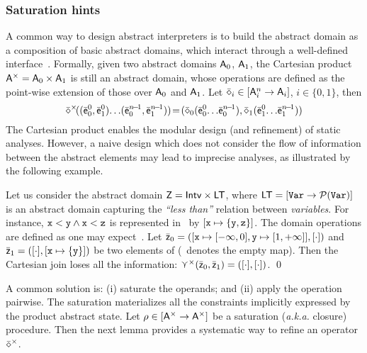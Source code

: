 \documentclass[sttt]{svjour}
\begin{document}
\subsubsection{Saturation hints}
A common way to design abstract interpreters is to build the abstract domain as a composition of basic abstract domains, which interact through a well-defined interface~\cite{CousotEtAl06,ChangLeino05,GulwaniEtAl08}.
Formally, given two abstract domains ${\mathsf{A}}_0$, ${\mathsf{A}}_{1}$, the Cartesian product ${\mathsf{A}}^\times = {\mathsf{A}}_0 \times {\mathsf{A}}_{1}$ is still an abstract domain, whose operations are defined as the point-wise extension of those over ${\mathsf{A}}_0$ and ${\mathsf{A}}_{1}$.
Let $\bar{\mathsf{\mathsf{\diamond}}}_i \in [{\mathsf{A}}_i^n \rightarrow{\mathsf{A}}_i]$, $i \in \{ 0, 1\}$, then 
\[
\ael{\op}^\times\!((\ael{e}^0_0, \ael{e}^0_1) \!\dots\! (\ael{e}^{n\!-\!1}_0, \ael{e}^{n\!-\!1}_1)) \!=\! (\ael{\op}_0(\ael{e}^0_0 \!\dots\! \ael{e}^{n\!-\!1}_0), \ael{\op}_1(\ael{e}^{0}_1 \!\dots\! \ael{e}^{n\!-\!1}_1))
\]
The Cartesian product enables the modular design (and refinement) of static analyses.
However, a naive design which does not consider the flow of information between the abstract elements may lead to imprecise analyses, as illustrated by the following example.

\begin{example}
\label{ex:cartesian}
Let us consider the abstract domain ${\mathsf{Z}} = \mathsf{Intv} \times \mathsf{LT}$, where $\mathsf{LT} = [\mathtt{Var} \rightarrow\mathcal{P}{(\mathtt{Var})}]$ is an abstract domain capturing the \emph{``less than''} relation between \emph{variables}.
For instance, $\mathtt{x} < \mathtt{y} \wedge \mathtt{x} < \mathtt{z}$ is represented in \LT\ by $[ \mathtt{x} \mapsto \{ \mathtt{y}, \mathtt{z}\}]$.
The domain operations are defined as one may expect~\cite{LogozzoMaf08}.
Let $\bar{\mathsf{\mathsf{z}}}_0 = ([\mathtt{x} \mapsto [-\infty, 0], \mathtt{y} \mapsto [1, +\infty]], [\cdot] )$ and $\bar{\mathsf{\mathsf{z}}}_1 = ([\cdot], [\mathtt{x} \mapsto \{ \mathtt{y}\}]  )$ be two elements of  (\emptyfun\ denotes the empty map).
Then the Cartesian join loses all the information: $\curlyvee^\times(\bar{\mathsf{\mathsf{z}}}_0, \bar{\mathsf{\mathsf{z}}}_1) = ([\cdot], [\cdot] )$. \qed
\end{example}

A common solution is: (i) saturate the operands; and (ii)  apply the operation pairwise.
The saturation materializes all the constraints implicitly expressed
by the product abstract state.
Let $\rho \in [{\mathsf{A}}^\times \rightarrow{\mathsf{A}}^\times]$ be a saturation (\emph{a.k.a.} closure) procedure.
Then the next lemma provides a systematic way to refine an operator $\bar{\mathsf{\mathsf{\diamond}}}^\times$.
\end{document}
